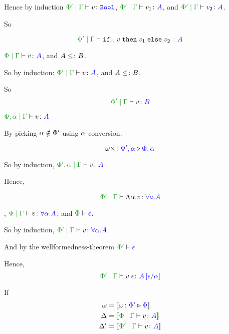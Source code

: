 \documentclass{report}
\begin{document}
    Hence by induction
    $\gppetyperelation{v}{\B}$, $\gppetyperelation{v_1}{A}$, and $\gppetyperelation{v_2}{A}$.

    So 

    \begin{equation}
        \gppetyperelation{\pifthenelse{A}{v}{v_1}{v_2}}{A}
    \end{equation}

    \bi $\gpetyperelation{v}{A}$, and $A\leq\colon B$.

    So by induction:
    $\gppetyperelation{v}{A}$, and $A\leq\colon B$.

    So \begin{equation}
        \gppetyperelation{v}{B}
    \end{equation}

    \bi $\etyperelation{\P, \a}{\G}{v}{A}$

    By picking $\alpha\notin\Phi'$ using $\alpha$-conversion.

    \begin{equation}
        \omega\times \colon {\color{blue}\Phi',\alpha} \triangleright {\color {blue} \Phi,\alpha}
    \end{equation}

    So by induction, $\etyperelation{\P', \a}{\G}{v}{A}$

    Hence,

    \begin{equation}
        \gppetyperelation{\elam{\a}{v}}{\all{a}{A}}
    \end{equation}


    \bi, $\gpetyperelation{v}{\all{\a}{A}}$, and $\wellformed{\P}{\e}$.

    So by induction, $\gppetyperelation{v}{\all{\a}{A}}$

    And by the wellformedness-theorem $\wellformed{\P'}{\e}$

    Hence, \begin{equation}
        \gppetyperelation{\eapp{v}{\e}}{A\ssub{\a}{\e}}
    \end{equation}


If 
\begin{align*}
    \w &= \deno{\wrelw{\P'}{\P}}\\
    \D &= \deno{\gpetyperelation{v}{A}}\\
    \D' &= \deno{\etyperelation{\P'}{\G}{v}{A}}\\
\end{align*}
\end{document}
